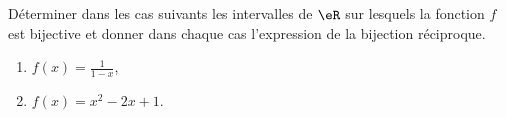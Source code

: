 
\begin{exercice}\label{exoTD4-0001}

	Déterminer dans les cas suivants les intervalles de $\eR$ sur lesquels la fonction $f$ est bijective et donner dans chaque cas l'expression de la bijection réciproque.
	\begin{enumerate}
		\item
			$f(x)=\frac{1}{ 1-x }$,
		\item			\label{ItemexoTD1ii}
			$f(x)=x^2-2x+1$.
	\end{enumerate}

\end{exercice}

